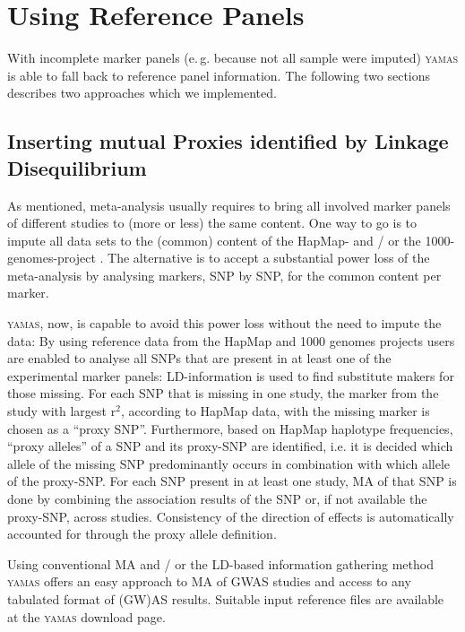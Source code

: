 \section{Using Reference Panels}

With incomplete marker panels (e.\,g. because not all sample were imputed) \textsc{yamas} is able to fall back to reference panel information. The following two sections describes two approaches which we implemented.

\subsection{Inserting mutual Proxies identified by Linkage Disequilibrium}
\label{algo:fillwithproxies}

As mentioned, meta-analysis usually requires to bring all involved marker panels of different studies to (more or less) the same content. One way to go is to impute all data sets to the (common) content of the HapMap- \citep{Consortium2003,Consortium2005,Consortium2007a} and / or the 1000-genomes-project \citep{Consortium2010}. The alternative is to accept a substantial power loss of the meta-analysis by analysing markers, SNP by SNP, for the common content per marker.

\textsc{yamas}, now, is capable to avoid this power loss without the need to impute the data: By using reference data from the HapMap and 1000 genomes projects users are enabled to analyse all SNPs that are present in at least one of the experimental marker panels: LD-information is used to find substitute makers for those missing. For each SNP that is missing in one study, the marker from the study with largest r$^2$, according to HapMap data, with the missing marker is chosen as a “proxy SNP”. Furthermore, based on HapMap haplotype frequencies, “proxy alleles” of a SNP and its proxy-SNP are identified, i.e. it is decided which allele of the missing SNP predominantly occurs in combination with which allele of the proxy-SNP. For each SNP present in at least one study, MA of that SNP is done by combining the association results of the SNP or, if not available the proxy-SNP, across studies. Consistency of the direction of effects is automatically accounted for through the proxy allele definition.

Using conventional MA and / or the LD-based information gathering method \textsc{yamas} offers an easy approach to MA of GWAS studies and access to any tabulated format of (GW)AS results. Suitable input reference files are available at the \textsc{yamas} download page.


